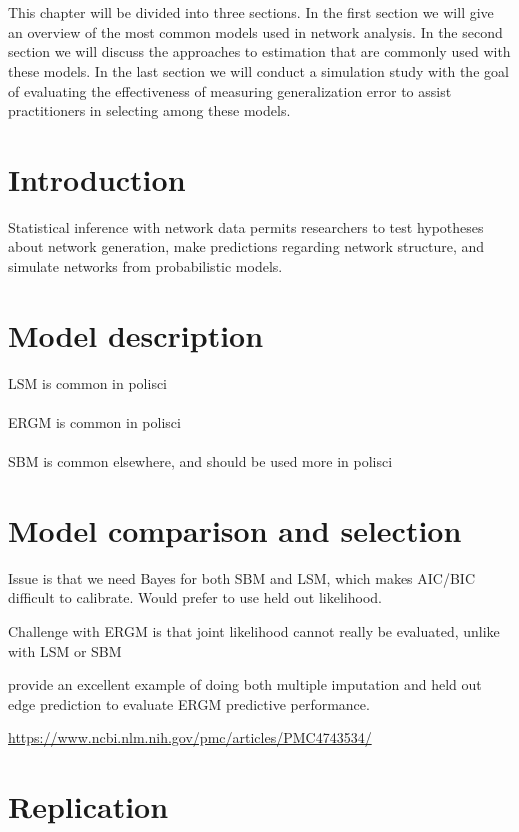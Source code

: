 \documentclass[fleqn,12pt]{wlscirep}
\begin{document}
\\~\\
 This chapter will be divided into three sections. In the first section we will give an overview of the most common models used in network analysis. In the second section we will discuss the approaches to estimation that are commonly used with these models. In the last section we will conduct a simulation study with the goal of evaluating the effectiveness of measuring generalization error to assist practitioners in selecting among these models.

\section{Introduction}

Statistical inference with network data permits researchers to test hypotheses about network generation, make predictions regarding network structure, and simulate networks from probabilistic models. 

\section{Model description}

LSM is common in polisci \\~\\
ERGM is common in polisci \\~\\
SBM is common elsewhere, and should be used more in polisci

\section{Model comparison and selection}

Issue is that we need Bayes for both SBM and LSM, which makes AIC/BIC difficult to calibrate. Would prefer to use held out likelihood.

Challenge with ERGM is that joint likelihood cannot really be evaluated, unlike with LSM or SBM

\citet{wang2016multiple} provide an excellent example of doing both multiple imputation and held out edge prediction to evaluate ERGM predictive performance.

\url{https://www.ncbi.nlm.nih.gov/pmc/articles/PMC4743534/}

\section{Replication}
\end{document}
